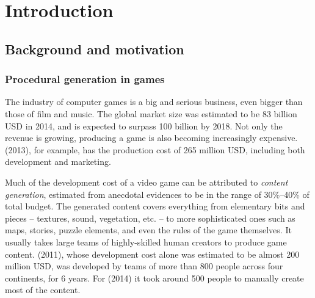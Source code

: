 \chapter{Introduction}

\section{Background and motivation}

\subsection{Procedural generation in games}

The industry of computer games is a big and serious business, even bigger than those of film and music.\cite{web-gamebigindustry} The global market size was estimated to be 83 billion USD in 2014, and is expected to surpass 100 billion by 2018.\cite{web-gamesmarket2018} Not only the revenue is growing, producing a game is also becoming increasingly expensive.  (2013), for example, has the production cost of 265 million USD, including both development and marketing.\cite{web-gta5}

Much of the development cost of a video game can be attributed to \textit{content generation}, estimated from anecdotal evidences to be in the range of 30\%--40\% of total budget.\cite{hendrikx2013procedural} The generated content covers everything from elementary bits and pieces -- textures, sound, vegetation, etc. -- to more sophisticated ones such as maps, stories, puzzle elements, and even the rules of the game themselves. It usually takes large teams of highly-skilled human creators to produce game content.  (2011), whose development cost alone was estimated to be almost 200 million USD, was developed by teams of more than 800 people across four continents, for 6 years.\cite{web-oldrepublic} For  (2014) it took around 500 people to manually create most of the content.\cite{web-expensivedevelop}

